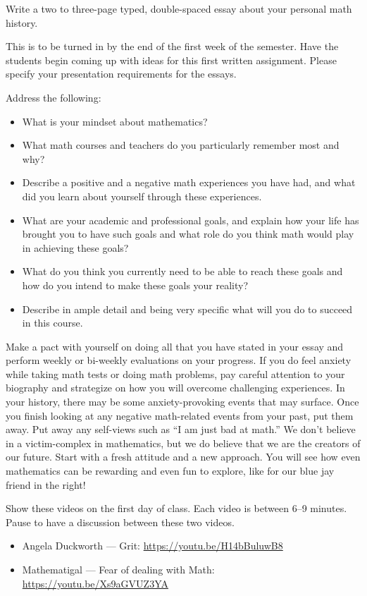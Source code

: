 \documentclass{article}
\begin{document}
Write a two to three-page typed, double-spaced essay about your personal math history.

\begin{notes}
  This is to be turned in by the end of the first week of the semester.  Have the students begin coming up with ideas for this first written assignment. Please specify your presentation requirements for the essays.
\end{notes}

Address the following:
\begin{itemize}
\item What is your mindset about mathematics?
\item What math courses and teachers do you particularly remember most and why?
\item Describe a positive and a negative math experiences you have had, and what did you learn about yourself through these experiences.
\item What are your academic and professional goals, and explain how your life has brought you to have such goals and what role do you think math would play in achieving these goals?
\item What do you think you currently need to be able to reach these goals and how do you intend to make these goals your reality?
\item Describe in ample detail and being very specific what will you do to succeed in this course.
\end{itemize}

Make a pact with yourself on doing all that you have stated in your essay and perform weekly or bi-weekly evaluations on your progress.  If you do feel anxiety while taking math tests or doing math problems, pay careful attention to your biography and strategize on how you will overcome challenging experiences. In your history, there may be some anxiety-provoking events that may surface. Once you finish looking at any negative math-related events from your past, put them away. Put away any self-views such as “I am just bad at math.” We don’t believe in a victim-complex in mathematics, but we do believe that we are the creators of our future. Start with a fresh attitude and a new approach.  You will see how even mathematics can be rewarding and even fun to explore, like for our blue jay friend in the right!

\begin{notes}

  Show these videos on the first day of class.  Each video is between 6--9 minutes.  Pause to have a discussion between these two videos.
  
  \begin{itemize}
  \item Angela Duckworth --- Grit: \url{https://youtu.be/H14bBuluwB8}
  \item Mathematigal --- Fear of dealing with Math: \url{https://youtu.be/Xs9aGVUZ3YA}
\end{itemize}

\end{notes}
\end{document}
